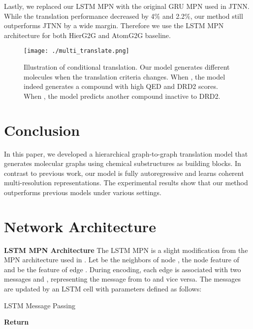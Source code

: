 \documentclass{article} \usepackage{iclr2020_conference,times}
\begin{document}
Lastly, we replaced our LSTM MPN with the original GRU MPN used in JTNN. While the translation performance decreased by 4\% and 2.2\%, our method still outperforms JTNN by a wide margin. Therefore we use the LSTM MPN architecture for both HierG2G and AtomG2G baseline. 

\begin{figure}[t]
    \centering
    \texttt{[image: ./multi\_translate.png]}
    \caption{Illustration of conditional translation. Our model generates different molecules when the translation criteria changes. When , the model indeed generates a compound with high QED and DRD2 scores. When , the model predicts another compound inactive to DRD2.}
    \label{fig:multi-translate}
    \vspace{-10pt}
\end{figure} \section{Conclusion}
In this paper, we developed a hierarchical graph-to-graph translation model that generates molecular graphs using chemical substructures as building blocks. In contrast to previous work, our model is fully autoregressive and learns coherent multi-resolution representations. The experimental results show that our method outperforms previous models under various settings. 



\newpage
\appendix
\section{Network Architecture}

\textbf{LSTM MPN Architecture } The LSTM MPN is a slight modification from the MPN architecture used in \citet{jin2018learning}. Let  be the neighbors of node ,  the node feature of  and  be the feature of edge . During encoding, each edge  is associated with two messages  and , representing the message from  to  and vice versa. The messages are updated by an LSTM cell with parameters   defined as follows: 
\begin{algorithm}
\caption{LSTM Message Passing}
\begin{algorithmic}
\FUNCTION{  }
\STATE \vspace{-8pt}
\vspace{-3pt}
\STATE \textbf{Return } 
\vspace{3pt}
\ENDFUNCTION
\end{algorithmic}
\end{algorithm}
\end{document}
